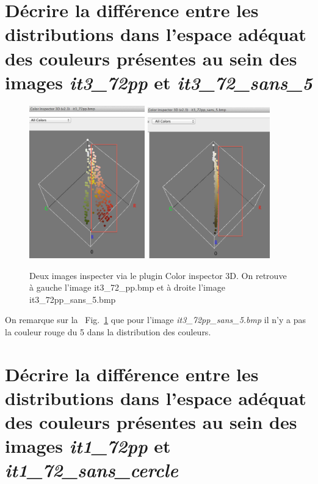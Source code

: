\documentclass[a4paper,10pt]{article}
\begin{document}
\section{D\'ecrire la diff\'erence entre les distributions dans l'espace ad\'equat des couleurs pr\'esentes au sein des images \emph{it3\_72pp} et \emph{it3\_72\_sans\_5}}

\begin{figure}[ht]
\begin{center}
	\includegraphics[width=5cm]{images/it3_72pp}
	\includegraphics[width=5.3cm]{images/it3_72pp_sans_5}
\end{center}
	\caption{Deux images inspecter via le plugin Color inspector 3D. On retrouve \`a gauche l'image it3\_72\_pp.bmp et \`a droite l'image it3\_72pp\_sans\_5.bmp}
	\label{img4}
\end{figure}

On remarque sur la ~Fig.~\ref{img4} que pour l'image \emph{it3\_72pp\_sans\_5.bmp} il n'y a pas la couleur rouge du 5 dans la distribution des couleurs.

\section{D\'ecrire la diff\'erence entre les distributions dans l'espace ad\'equat des couleurs pr\'esentes au sein des images \emph{it1\_72pp} et \emph{it1\_72\_sans\_cercle}}
\end{document}
